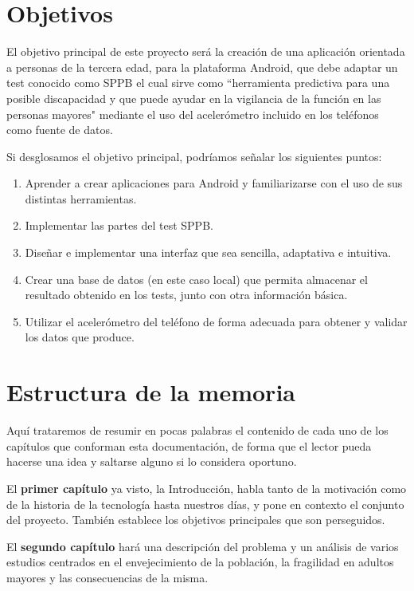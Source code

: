 \section{Objetivos}

El objetivo principal de este proyecto será la creación de una aplicación orientada a personas de la tercera edad, para la plataforma Android, que debe adaptar un test conocido como SPPB el cual sirve como ``herramienta predictiva para una posible discapacidad y que puede ayudar en la vigilancia de la función en las personas mayores"\cite{SPBB_manual} mediante el uso del acelerómetro incluido en los teléfonos como fuente de datos.

Si desglosamos el objetivo principal, podríamos señalar los siguientes puntos:
\begin{enumerate}
  \item Aprender a crear aplicaciones para Android y familiarizarse con el uso de sus distintas herramientas.
  \item Implementar las partes del test SPPB.
  \item Diseñar e implementar una interfaz que sea sencilla, adaptativa e intuitiva.
  \item Crear una base de datos (en este caso local) que permita almacenar el resultado obtenido en los tests, junto con otra información básica.
  \item Utilizar el acelerómetro del teléfono de forma adecuada para obtener y validar los datos que produce.
\end{enumerate}

\section{Estructura de la memoria}

Aquí trataremos de resumir en pocas palabras el contenido de cada uno de los capítulos que conforman esta documentación, de forma que el lector pueda hacerse una idea y saltarse alguno si lo considera oportuno.

El \textbf{primer capítulo} ya visto, la Introducción, habla tanto de la motivación como de la historia de la tecnología hasta nuestros días, y pone en contexto el conjunto del proyecto. También establece los objetivos principales que son perseguidos.

El \textbf{segundo capítulo} hará una descripción del problema y un análisis de varios estudios centrados en el envejecimiento de la población, la fragilidad en adultos mayores y las consecuencias de la misma.

